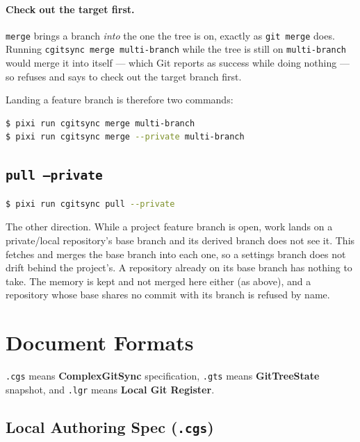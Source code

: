\paragraph{Check out the target first.} \texttt{merge} brings a branch
\emph{into} the one the tree is on, exactly as \texttt{git merge} does.
Running \texttt{cgitsync merge multi-branch} while the tree is still on
\texttt{multi-branch} would merge it into itself --- which Git reports as
success while doing nothing --- so \cgscli{} refuses and says to check out
the target branch first.

Landing a feature branch is therefore two commands:

\begin{lstlisting}[language=bash]
$ pixi run cgitsync merge multi-branch
$ pixi run cgitsync merge --private multi-branch
\end{lstlisting}

\subsection{\texttt{pull --private}}

\begin{lstlisting}[language=bash]
$ pixi run cgitsync pull --private
\end{lstlisting}

The other direction. While a project feature branch is open, work lands on
a private/local repository's base branch and its derived branch does not
see it. This fetches and merges the base branch into each one, so a
settings branch does not drift behind the project's. A repository already
on its base branch has nothing to take. The memory is kept and not merged
here either (as above), and a repository whose base shares no commit with its
branch is refused by name.

\section{Document Formats}

\texttt{.cgs} means \textbf{ComplexGitSync} specification, \texttt{.gts} means
\textbf{GitTreeState} snapshot, and \texttt{.lgr} means
\textbf{Local Git Register}.

\subsection{Local Authoring Spec (\texttt{.cgs})}

